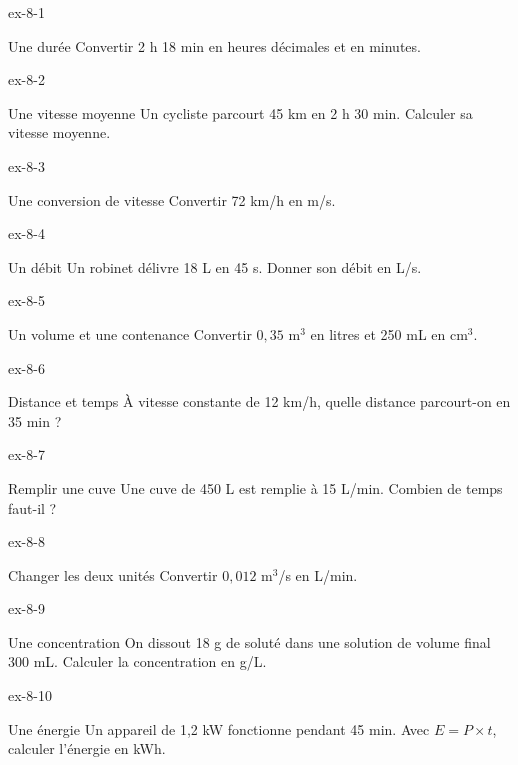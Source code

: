 \clearpage{}
\begin{blocLivre}{ex-8-1}\begin{exercice}[1]{Une durée}
Convertir 2 h 18 min en heures décimales et en minutes.
\end{exercice}\end{blocLivre}
\begin{blocLivre}{ex-8-2}\begin{exercice}[1]{Une vitesse moyenne}
Un cycliste parcourt 45 km en 2 h 30 min. Calculer sa vitesse moyenne.
\end{exercice}\end{blocLivre}
\begin{blocLivre}{ex-8-3}\begin{exercice}[1]{Une conversion de vitesse}
Convertir 72 km/h en m/s.
\end{exercice}\end{blocLivre}
\begin{blocLivre}{ex-8-4}\begin{exercice}[1]{Un débit}
Un robinet délivre 18 L en 45 s. Donner son débit en L/s.
\end{exercice}\end{blocLivre}
\begin{blocLivre}{ex-8-5}\begin{exercice}[1]{Un volume et une contenance}
Convertir $0{,}35$ m$^3$ en litres et 250 mL en cm$^3$.
\end{exercice}\end{blocLivre}

\begin{blocLivre}{ex-8-6}\begin{exercice}[2]{Distance et temps}
À vitesse constante de 12 km/h, quelle distance parcourt-on en 35 min ?
\end{exercice}\end{blocLivre}
\begin{blocLivre}{ex-8-7}\begin{exercice}[2]{Remplir une cuve}
Une cuve de 450 L est remplie à 15 L/min. Combien de temps faut-il ?
\end{exercice}\end{blocLivre}
\begin{blocLivre}{ex-8-8}\begin{exercice}[2]{Changer les deux unités}
Convertir $0{,}012$ m$^3$/s en L/min.
\end{exercice}\end{blocLivre}
\begin{blocLivre}{ex-8-9}\begin{exercice}[2]{Une concentration}
On dissout 18 g de soluté dans une solution de volume final 300 mL. Calculer la concentration en g/L.
\end{exercice}\end{blocLivre}
\begin{blocLivre}{ex-8-10}\begin{exercice}[2]{Une énergie}
Un appareil de 1,2 kW fonctionne pendant 45 min. Avec $E=P\times t$, calculer l’énergie en kWh.
\end{exercice}\end{blocLivre}

